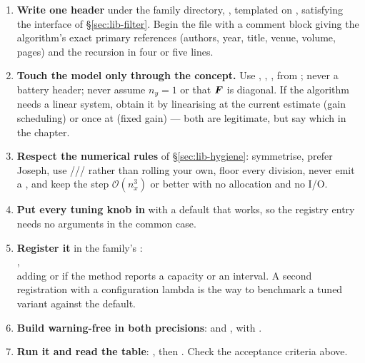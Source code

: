 \begin{enumerate}[leftmargin=*,topsep=2pt,itemsep=3pt]
\item \textbf{Write one header} under the family directory, , templated on
, satisfying the interface of \S\ref{sec:lib-filter}. Begin the file with a
comment block giving the algorithm's exact primary references (authors, year, title, venue,
volume, pages) and the recursion in four or five lines.

\item \textbf{Touch the model only through the concept.} Use , ,
,  from ; never  a battery
header; never assume $n_y=1$ or that $\bm{F}$ is diagonal. If the algorithm needs a linear system,
obtain it by linearising at the current estimate (gain scheduling) or once at  (fixed
gain) --- both are legitimate, but say which in the chapter.

\item \textbf{Respect the numerical rules} of \S\ref{sec:lib-hygiene}: symmetrise, prefer Joseph,
use /// rather than rolling
your own, floor every division, never emit a , and keep the step
$\mathcal{O}(n_x^3)$ or better with no allocation and no I/O.

\item \textbf{Put every tuning knob in } with a default that works, so the
registry entry needs no arguments in the common case.

\item \textbf{Register it} in the family's :\\
,\\
adding
 or  if the method reports a capacity or an
interval. A second registration with a configuration lambda is the way to benchmark a tuned
variant against the default.

\item \textbf{Build warning-free in both precisions}:
 and
, with
.

\item \textbf{Run it and read the table}:
,
then . Check the acceptance criteria above.


\end{enumerate}
